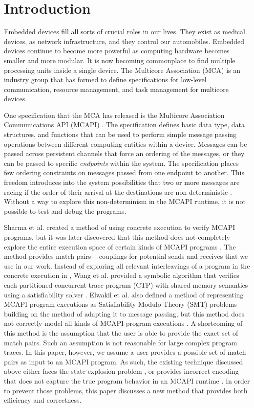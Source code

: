 \section{Introduction}
Embedded devices fill all sorts of crucial roles in our lives. They exist as
medical devices, as network infrastructure, and they control our automobiles.
Embedded devices continue to become more powerful as computing hardware becomes
smaller and more modular. It is now becoming commonplace to find multiple
processing units inside a single device. The Multicore Association (MCA) \cite{mca} is an
industry group that has formed to define specifications for low-level
communication, resource management, and task management for
multicore devices.

One specification that the MCA has released is the Multicore Association
Communications API (MCAPI) \cite{mcapi}. The specification defines basic data type, data
structures, and functions that can be used to perform simple message passing
operations between different computing entities within a device. Messages can be
passed across persistent channels that force an ordering of the messages, or
they can be passed to specific \emph{endpoints} within the system. The specification places few ordering constraints on messages passed from one
endpoint to another. This freedom introduces into the system possibilities that two or more messages are racing if the order of their arrival at the destinations are non-deterministic \cite{netzer:spdt96}. Without a way to explore this non-determinism in the MCAPI runtime, it is not possible to test and debug the programs.

Sharma et al. created a method of using concrete execution to verify MCAPI
programs, but it was later discovered that this method does not completely
explore the entire execution space of certain kinds of MCAPI programs \cite{sharma:fmcad09}. The method provides match pairs -- couplings for potential sends and receives that we use in our work. Instead of exploring all relevant interleavings of a program in the concrete execution in \cite{sharma:fmcad09}, Wang et al. provided a symbolic algorithm that verifies each partitioned concurrent trace program (CTP) with shared memory semantics using a satisfiability solver \cite{wang:fse09}. Elwakil et al. also defined a method of representing MCAPI program executions as Satisfiability Modulo Theory (SMT) problems building on the method of \cite{wang:fse09} adapting it to message passing, but this method does not correctly model all kinds of MCAPI program executions \cite{elwakil:padtad10}. A shortcoming of this method is the assumption that the user is able to provide the exact set of match pairs. Such an assumption is not reasonable for large complex program traces. In this paper, however, we assume a user provides a possible set of match pairs as input to an MCAPI program. As such, the existing technique discussed above either faces the state explosion problem \cite{sharma:fmcad09}, or provides incorrect encoding that does not capture the true program behavior in an MCAPI runtime \cite{elwakil:padtad10}. In order to prevent those problems, this paper discusses a new method that provides both efficiency and correctness.

